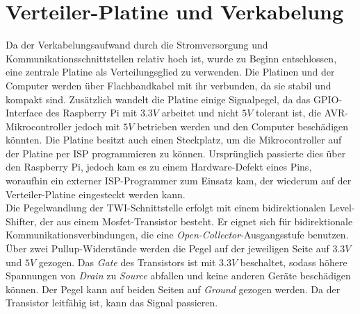 \section{Verteiler-Platine und Verkabelung}
Da der Verkabelungsaufwand durch die Stromversorgung und Kommunikationsschnittstellen relativ hoch ist, wurde zu Beginn entschlossen, eine zentrale Platine als Verteilungsglied zu verwenden. Die Platinen und der Computer werden über Flachbandkabel mit ihr verbunden, da sie stabil und kompakt sind. Zusätzlich wandelt die Platine einige Signalpegel, da das \ac{GPIO}-Interface des Raspberry Pi mit $3.3V$ arbeitet und nicht $5V$ tolerant ist, die AVR-Mikrocontroller jedoch mit $5V$ betrieben werden und den Computer beschädigen könnten. Die Platine besitzt auch einen Steckplatz, um die Mikrocontroller auf der Platine per \ac{ISP} programmieren zu können. Ursprünglich passierte dies über den Raspberry Pi, jedoch kam es zu einem Hardware-Defekt eines Pins, woraufhin ein externer ISP-Programmer zum Einsatz kam, der wiederum auf der Verteiler-Platine eingesteckt werden kann.\\
Die Pegelwandlung der \ac{TWI}-Schnittstelle erfolgt mit einem bidirektionalen Level-Shifter, der aus einem Mosfet-Transistor besteht. Er eignet sich für bidirektionale Kommunikationsverbindungen, die eine \textit{Open-Collector}-Ausgangsstufe benutzen. Über zwei Pullup-Widerstände werden die Pegel auf der jeweiligen Seite auf $3.3V$ und $5V$ gezogen. Das \textit{Gate} des Transistors ist mit $3.3V$ beschaltet, sodass höhere Spannungen von \textit{Drain} zu \textit{Source} abfallen und keine anderen Geräte beschädigen können. Der Pegel kann auf beiden Seiten auf \textit{Ground} gezogen werden. Da der Transistor leitfähig ist, kann das Signal passieren. %


